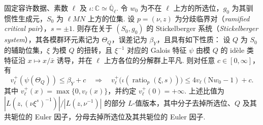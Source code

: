 \begin{lemma}
\label{lem:c-selmer-ratio-transfer}
\emitthmsource
固定容许数据、素数 $\ell$ 及 $\iota\colon\mathbb C\simeq\overline{\mathbb Q}_\ell$. 令 $w_0$ 为不在 $\ell$ 上方的所选位，$g_0$ 为其驯惯性生成元，$S_0$ 为 $\ell MN$ 上方的位集. 设 $p=(\nu,z)$ 为分歧临界对（\emph{ramified critical pair}），$s=\pm1$. 则存在关于 $(S_0,g_0)$ 的 Stickelberger 系统（\emph{Stickelberger system}），其各模群环元素记为 $\Theta_Q$，误差记为 $\beta_Y$，且具有如下性质：
设 $Q$ 为 $S_0$ 的辅助位集，$\xi$ 为模 $Q$ 的扭转，且 $\xi^{-1}$ 对应的 Galois 特征 $\psi$ 由模 $Q$ 的 idèle 类特征沿 $x\mapsto x/\bar x$ 诱导，并在 $\ell$ 上方各位的分解群上平凡. 则对任意 $c\in[0,\infty]$，有
\[
 v_\ell^+(\psi(\Theta_Q))\le\beta_Y+c
 \quad\Longrightarrow\quad
 v_\ell^+\bigl(\iota(\operatorname{ratio}_{p}(\xi,s))\bigr)
 \le4v_\ell(\mathrm Nw_0-1)+c .
\]
其中 $v_\ell^+(x)=\max\{0,v_\ell(x)\}$，并约定 $v_\ell^+(0)=+\infty$. 上述比值为 $|L(z,(\nu\xi^s)^{-1})|/|L(z,\nu^{-1})|$ 的部分 $L$-值版本，其中分子去掉所选位、$Q$ 及其共轭位的 Euler 因子，分母去掉所选位及其共轭位的 Euler 因子.
\end{lemma}
